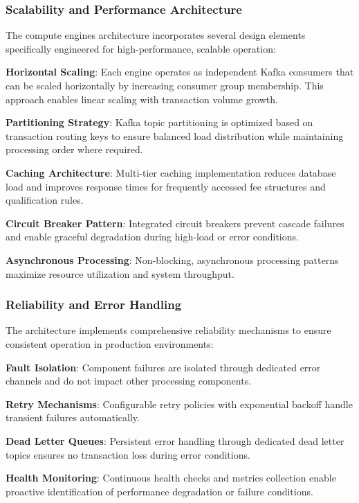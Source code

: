 \subsubsection{Scalability and Performance Architecture}

The compute engines architecture incorporates several design elements specifically engineered for high-performance, scalable operation:

\textbf{Horizontal Scaling}: Each engine operates as independent Kafka consumers that can be scaled horizontally by increasing consumer group membership. This approach enables linear scaling with transaction volume growth.

\textbf{Partitioning Strategy}: Kafka topic partitioning is optimized based on transaction routing keys to ensure balanced load distribution while maintaining processing order where required.

\textbf{Caching Architecture}: Multi-tier caching implementation reduces database load and improves response times for frequently accessed fee structures and qualification rules.

\textbf{Circuit Breaker Pattern}: Integrated circuit breakers prevent cascade failures and enable graceful degradation during high-load or error conditions.

\textbf{Asynchronous Processing}: Non-blocking, asynchronous processing patterns maximize resource utilization and system throughput.

\subsubsection{Reliability and Error Handling}

The architecture implements comprehensive reliability mechanisms to ensure consistent operation in production environments:

\textbf{Fault Isolation}: Component failures are isolated through dedicated error channels and do not impact other processing components.

\textbf{Retry Mechanisms}: Configurable retry policies with exponential backoff handle transient failures automatically.

\textbf{Dead Letter Queues}: Persistent error handling through dedicated dead letter topics ensures no transaction loss during error conditions.

\textbf{Health Monitoring}: Continuous health checks and metrics collection enable proactive identification of performance degradation or failure conditions.

